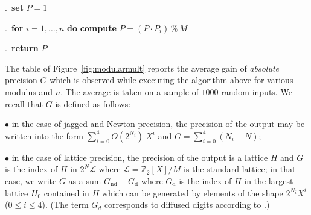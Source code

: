 \documentclass{sig-alternate-05-2015}
\newcommand{\Z}{\mathbb Z}
\renewcommand{\mod}{\,\%\,}
\theoremstyle{definition}
\begin{document}
.\ {\bf set} $P = 1$

.\ {\bf for} $i=1,\dots,n$ {\bf do} {\bf compute} $P = (P 
\cdot P_i) \mod M$

.\ {\bf return} $P$

\vspace{-1ex}\noindent\hrulefill

\medskip

The table of Figure~\ref{fig:modularmult} reports the average gain of 
\emph{absolute} precision $G$ which is observed while executing the 
algorithm above for various modulus and $n$. The average is taken on a 
sample of $1000$ random inputs. We recall that $G$ is defined as 
follows:

\noindent $\bullet$
in the case of jagged and Newton precision, the precision of the output 
may be written into the form $\sum_{i=0}^4 O(2^{N_i}) \: X^i$ and 
$G = \sum_{i=0}^4 (N_i - N)$;

\noindent $\bullet$
in the case of lattice precision, the precision of the output is a 
lattice $H$ and $G$ is the index of $H$ in $2^N \mathcal L$ where 
$\mathcal L = \Z_2[X]/M$ is the standard lattice; in that case, we write 
$G$ as a sum $G_{\text{nd}} + G_{\text{d}}$ where $G_{\text{d}}$ is the 
index of $H$ in the largest lattice $H_0$ contained in $H$ which can be 
generated by elements of the shape $2^{N_i} X^i$ ($0 \leq i \leq 4$). 
(The term $G_d$ corresponds to diffused digits according to 
\cite[Definition~2.3]{caruso-roe-vaccon:15a}.)
\end{document}

